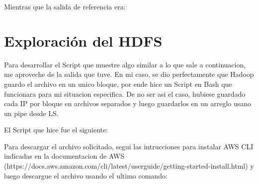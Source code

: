 \documentclass[9pt,letterpaper,twoside]{article}
\begin{document}
\newpage

\begin{code}[H]
    
\end{code}

\begin{code}[H]
    
\end{code}

\noindent
Mientras que la salida de referencia era:

\begin{code}[H]

\end{code}

\newpage

\section{Exploración del HDFS}

\noindent
Para desarrollar el Script que muestre algo similar a lo que sale a continuacion, me aproveche de la salida que tuve. En mi caso, se dio perfectamente
que Hadoop guardo el archivo en un unico bloque, por ende hice un Script en Bash que funcionara para mi
situacion especifica. De no ser asi el caso, hubiese guardado cada IP por bloque en archivos separados y luego
guardarlos en un arreglo usano un pipe desde LS.

\begin{code}[H]

\end{code}

\noindent
El Script que hice fue el siguiente:

\begin{code}[H]
    
\end{code}

\newpage

\noindent
Para descargar el archivo solicitado, segui las intrucciones para instalar AWS CLI indicadas en la documentacion de AWS (https://docs.aws.amazon.com/cli/latest/userguide/getting-started-install.html)
y luego descargue el archivo usando el ultimo comando:
\end{document}
